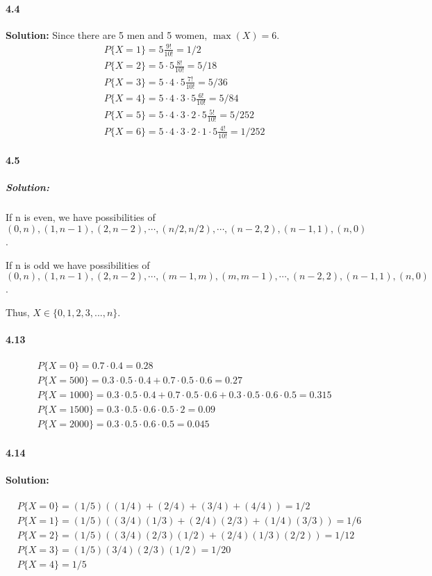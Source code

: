\documentclass[11pt]{article}
\begin{document}
	\paragraph{4.4}\textbf{Solution:} Since there are 5 men and 5 women, $\max(X) = 6$.
		\begin{align}
			&P\{X=1\} = 5\frac{9!}{10!} = 1/2\nonumber\\
			&P\{X=2\} = 5\cdot 5\frac{8!}{10!} = 5/18\nonumber\\
			&P\{X=3\} = 5\cdot 4\cdot 5\frac{7!}{10!} = 5/36\nonumber\\
			&P\{X=4\} = 5\cdot 4\cdot 3\cdot 5\frac{6!}{10!} = 5/84\nonumber\\
			&P\{X=5\} = 5\cdot 4\cdot 3\cdot 2\cdot 5\frac{5!}{10!} = 5/252\nonumber\\
			&P\{X=6\} = 5\cdot 4\cdot 3\cdot 2\cdot 1\cdot 5\frac{4!}{10!} = 1/252\nonumber
		\end{align}
	\paragraph{4.5}
		\subparagraph{Solution:}
			If n is even, we have possibilities of $(0, n), (1, n - 1), (2, n - 2), \cdots, (n/2, n/2), \cdots, (n - 2, 2), (n - 1, 1), (n, 0)$.
			
			If n is odd we have possibilities of $(0, n), (1, n - 1), (2, n - 2), \cdots, (m - 1, m), (m , m - 1), \cdots, (n - 2, 2), (n - 1, 1), (n, 0)$.
			
			Thus, $X \in \{0, 1, 2, 3, ... , n\}$.
	\paragraph{4.13}
		\begin{align}
			&P\{X = 0\} = 0.7\cdot 0.4 = 0.28\nonumber\\
			&P\{X = 500\} = 0.3\cdot 0.5\cdot 0.4 + 0.7\cdot 0.5\cdot 0.6 = 0.27\nonumber\\
			&P\{X = 1000\} = 0.3\cdot 0.5\cdot 0.4 + 0.7\cdot 0.5\cdot 0.6 + 0.3\cdot 0.5 \cdot 0.6 \cdot 0.5 = 0.315\nonumber\\
			&P\{X = 1500\} = 0.3\cdot 0.5 \cdot 0.6 \cdot 0.5\cdot 2 = 0.09\nonumber\\
			&P\{X = 2000\} = 0.3\cdot 0.5 \cdot 0.6 \cdot 0.5 = 0.045\nonumber
		\end{align}
	\paragraph{4.14}
		\paragraph{Solution:}
			\begin{align}
				&P\{X = 0\} = (1/5)((1/4) + (2/4) + (3/4) + (4/4)) = 1/2\nonumber\\
				&P\{X = 1\} = (1/5)((3/4)(1/3) + (2/4)(2/3) + (1/4)(3/3)) = 1/6\nonumber\\
				&P\{X = 2\} = (1/5)((3/4)(2/3)(1/2) + (2/4)(1/3)(2/2)) = 1/12\nonumber\\
				&P\{X = 3\} = (1/5)(3/4)(2/3)(1/2) = 1/20\nonumber\\
				&P\{X = 4\} = 1/5\nonumber
			\end{align}
\end{document}
